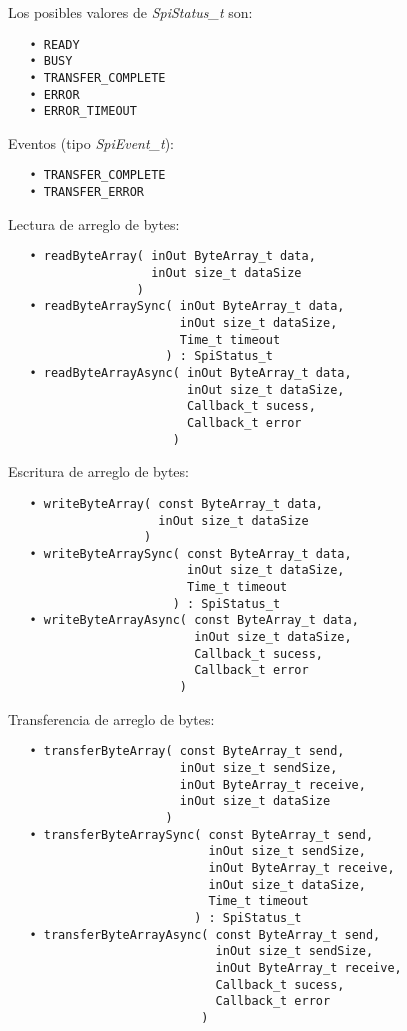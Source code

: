 Los posibles valores de \emph{SpiStatus\_t} son:

\begin{verbatim}
   • READY
   • BUSY
   • TRANSFER_COMPLETE
   • ERROR
   • ERROR_TIMEOUT
\end{verbatim}

Eventos (tipo \emph{SpiEvent\_t}):

\begin{verbatim}
   • TRANSFER_COMPLETE
   • TRANSFER_ERROR
\end{verbatim}



Lectura de arreglo de bytes:

\begin{verbatim}
   • readByteArray( inOut ByteArray_t data,
                    inOut size_t dataSize
                  )
   • readByteArraySync( inOut ByteArray_t data,
                        inOut size_t dataSize,
                        Time_t timeout
                      ) : SpiStatus_t
   • readByteArrayAsync( inOut ByteArray_t data, 
                         inOut size_t dataSize,
                         Callback_t sucess,
                         Callback_t error 
                       )
\end{verbatim}

Escritura de arreglo de bytes:

\begin{verbatim}
   • writeByteArray( const ByteArray_t data,
                     inOut size_t dataSize
                   )
   • writeByteArraySync( const ByteArray_t data,
                         inOut size_t dataSize,
                         Time_t timeout
                       ) : SpiStatus_t
   • writeByteArrayAsync( const ByteArray_t data, 
                          inOut size_t dataSize,
                          Callback_t sucess,
                          Callback_t error 
                        )
\end{verbatim}

\pagebreak

Transferencia de arreglo de bytes:

\begin{verbatim}
   • transferByteArray( const ByteArray_t send,
                        inOut size_t sendSize,
                        inOut ByteArray_t receive,
                        inOut size_t dataSize
                      )
   • transferByteArraySync( const ByteArray_t send,
                            inOut size_t sendSize,
                            inOut ByteArray_t receive,
                            inOut size_t dataSize,
                            Time_t timeout
                          ) : SpiStatus_t
   • transferByteArrayAsync( const ByteArray_t send,
                             inOut size_t sendSize,
                             inOut ByteArray_t receive,
                             Callback_t sucess,
                             Callback_t error 
                           )
\end{verbatim}

